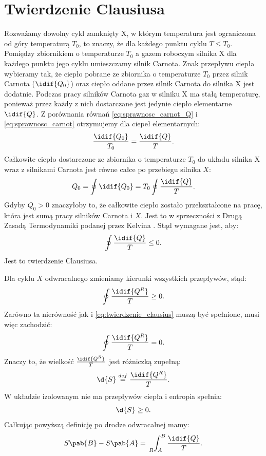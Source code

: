 
\section{Twierdzenie Clausiusa}
Rozważamy dowolny cykl zamknięty X, w którym temperatura jest ograniczona od góry temperaturą \(T_0\), to znaczy, że dla każdego punktu cyklu \(T \leq T_0\). Pomiędzy zbiornikiem o temperaturze \(T_0\) a gazem roboczym silnika X dla każdego punktu jego cyklu umieszczamy silnik Carnota. Znak przepływu ciepła wybieramy tak, że ciepło pobrane ze zbiornika o temperaturze \(T_0\) przez silnik Carnota (\(\idif{Q_0}\)) oraz ciepło oddane przez silnik Carnota do silnika X jest dodatnie. Podczas pracy silników Carnota gaz w silniku X ma stałą temperaturę, ponieważ przez każdy z nich dostarczane jest jedynie ciepło elementarne \(\idif{Q}\). Z porównania równań \eqref{eq:sprawnosc_carnot_Q} i \eqref{eq:sprawnosc_carnot} otrzymujemy dla ciepeł elementarnych:
\begin{equation}
	\frac{\idif{Q_0}}{T_0} = \frac{\idif{Q}}{T}.
\end{equation}
Całkowite ciepło dostarczone ze zbiornika o temperaturze \(T_0\) do układu silnika X wraz z silnikami Carnota jest równe całce po przebiegu silnika \(X\):
\begin{equation}
	Q_0 = \oint \idif{Q_0} = T_0 \oint \frac{\idif{Q}}{T}.
\end{equation}
Gdyby \(Q_0 > 0\) znaczyłoby to, że całkowite ciepło zostało przekształcone na pracę, która jest sumą pracy silników Carnota i \(X\). Jest to w sprzeczności z Drugą Zasadą Termodynamiki podanej przez Kelvina \cite{b:pudlik_termodynamika}. Stąd wymagane jest, aby:
\begin{equation}\label{eq:twierdzenie_clausius}
	\oint \frac{\idif{Q}}{T} \leq 0.
\end{equation}
Jest to twierdzenie Clausiusa.

Dla cyklu \(X\) odwracalnego zmieniamy kierunki wszystkich przepływów, stąd:
\begin{equation}
	\oint \frac{\idif{Q^R}}{T} \geq 0.
\end{equation}
Zarówno ta nierówność jak i \eqref{eq:twierdzenie_clausius} muszą być spełnione, musi więc zachodzić:
\begin{equation}
	\oint \frac{\idif{Q^R}}{T} = 0.
\end{equation}
Znaczy to, że wielkość \(\frac{\idif{Q^R}}{T}\) jest różniczką zupełną:
\begin{equation}\label{eq:def_entropia}
	\d{S} \overset{def}{=} \frac{\idif{Q^R}}{T}.
\end{equation}
W układzie izolowanym nie ma przepływów ciepła i entropia spełnia:
\begin{equation}\label{eq:2zt_dS}
	\d{S} \geq 0.
\end{equation}
Całkując powyższą definicję po drodze odwracalnej mamy:
\begin{equation}
	S\pab{B} - S\pab{A} = \sideset{_R}{_A^B}{\int} \frac{\idif{Q}}{T}.
\end{equation}


